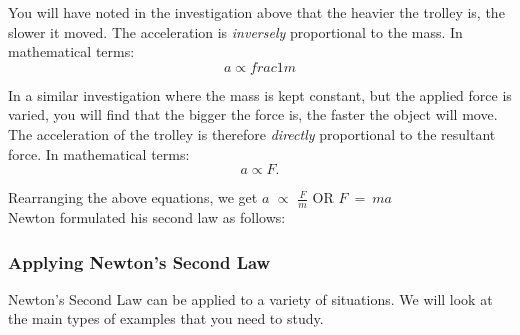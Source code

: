 You will have noted in the investigation above that the heavier the trolley is, the slower it moved. The acceleration is \textit{inversely} proportional to the mass. In mathematical terms: 
\begin{equation*}
a \propto frac{1}{m}
\end{equation*}

In a similar investigation where the mass is kept constant, but the applied force is varied, you will find that the bigger the force is, the faster the object will move. The acceleration of the trolley is therefore \textit{directly} proportional to the resultant force. In mathematical terms: 
\begin{equation*}
a \propto F.
\end{equation*}

Rearranging the above equations, we get $a$ $\propto$ $\frac{F}{m}$ OR $F~=~ma$\\

Newton formulated his second law as follows:\\


\subsubsection{Applying Newton's Second Law}
Newton's Second Law can be applied to a variety of situations. We will look at the main types of examples that you need to study.


